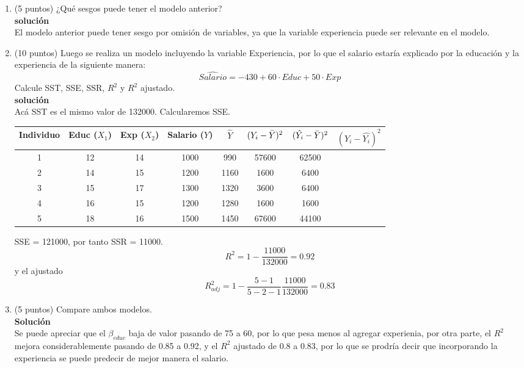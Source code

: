 \documentclass[10pt,a4paper]{article}
\begin{document}
\begin{enumerate}
\begin{enumerate}
    \item (5 puntos) ¿Qué sesgos puede tener el modelo anterior?
    \\
    \textbf{solución}
    \\
    El modelo anterior puede tener sesgo por omisión de variables, ya que la variable experiencia puede ser relevante en el modelo.
    \\

    \item (10 puntos) Luego se realiza un modelo incluyendo la variable Experiencia, por lo que el salario estaría explicado por la educación y la experiencia de la siguiente manera:
    $$\widehat{Salario} = -430 + 60 \cdot Educ + 50 \cdot Exp$$
    Calcule SST, SSE, SSR, $R^2$ y $R^2$ ajustado.
    \\
    \textbf{solución}
    \\
    Acá SST es el mismo valor de 132000. Calcularemos SSE.
    \begin{center}
\begin{tabular}{|c|c|c|c|c|c|c|c|}
\hline
\textbf{Individuo} & \textbf{Educ} ($X_1$) & \textbf{Exp} ($X_2$)  & \textbf{Salario ($Y$)} & $\hat{Y}$ & $(Y_i - \Bar{Y})^2$ & $(\hat{Y_i} - \Bar{Y})^2$ & $(Y_i-\hat{Y_i})^2$\\
\hline
1 & 12 & 14 & 1000 & 990 & 57600 & 62500& \\
2 & 14 & 15 & 1200 & 1160 & 1600  & 6400 & \\
3 & 15 & 17 & 1300 & 1320 & 3600  & 6400& \\
4 & 16 & 15 & 1200 & 1280 & 1600  & 1600& \\
5 & 18 & 16 & 1500 & 1450 & 67600 & 44100& \\
\hline
\end{tabular}
\end{center}
SSE = 121000, por tanto SSR = 11000. 
$$R^2 = 1- \frac{11000}{132000}=0.92$$
y el ajustado
$$R^2_{adj}= 1- \frac{5-1}{5-2-1}\frac{11000}{132000}=0.83$$
    \item (5 puntos) Compare ambos modelos. 
    \\
    \textbf{Solución}
    \\
    Se puede apreciar que el $\beta_{educ}$ baja de valor pasando de 75 a 60, por lo que pesa menos al agregar experienia, por otra parte, el $R^2$ mejora considerablemente pasando de 0.85 a 0.92, y el $R^2$ ajustado de 0.8 a 0.83, por lo que se prodría decir que incorporando la experiencia se puede predecir de mejor manera el salario.
\end{enumerate}

\end{enumerate}
\end{document}
